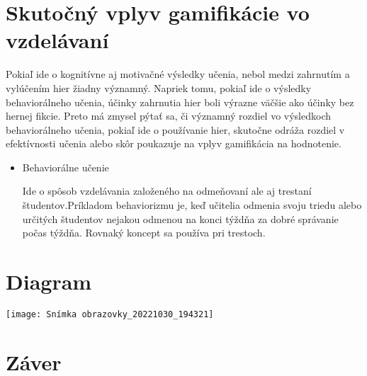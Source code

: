 \documentclass[10pt,twoside,slovak,a4paper]{article}
\begin{document}
\section{Skutočný vplyv gamifikácie vo vzdelávaní} 
Pokiaľ ide o kognitívne aj motivačné výsledky učenia, nebol medzi zahrnutím a vylúčením hier žiadny významný. Napriek tomu, pokiaľ ide o výsledky behaviorálneho učenia, účinky zahrnutia hier boli výrazne väčšie ako účinky bez hernej fikcie. Preto má zmysel pýtať sa, či významný rozdiel vo výsledkoch behaviorálneho učenia, pokiaľ ide o používanie hier, skutočne odráža rozdiel v efektívnosti učenia alebo skôr poukazuje na vplyv gamifikácia na hodnotenie.

\begin{itemize}
    \item Behaviorálne učenie

Ide o spôsob vzdelávania založeného na odmeňovaní ale aj trestaní študentov.Príkladom behaviorizmu je, keď učitelia odmenia svoju triedu alebo určitých študentov nejakou odmenou na konci týždňa za dobré správanie počas týždňa. Rovnaký koncept sa používa pri trestoch.
\end{itemize}

\section{Diagram}
\texttt{[image: Snímka obrazovky\_20221030\_194321]}


\section{Záver} \label{zaver} %




\end{document}
